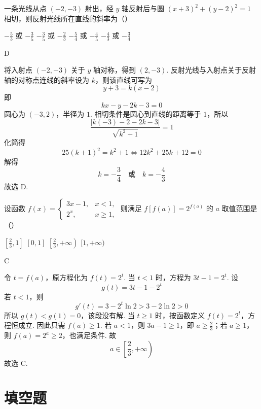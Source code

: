 \begin{problem}
一条光线从点 \((-2,-3)\) 射出，经 \(y\) 轴反射后与圆 \((x + 3)^2 + (y - 2)^2 = 1\) 相切，则反射光线所在直线的斜率为（\quad）

\choices
    {\(-\frac{5}{3}\) 或 \(-\frac{3}{5}\)}
    {\(-\frac{3}{5}\) 或 \(-\frac{2}{3}\)}
    {\(-\frac{5}{4}\) 或 \(-\frac{4}{5}\)}
    {\(-\frac{4}{3}\) 或 \(-\frac{3}{4}\)}
\end{problem}

\begin{answer}
D
\end{answer}

\begin{solution}
将入射点 \((-2,-3)\) 关于 \(y\) 轴对称，得到 \((2,-3)\). 反射光线与入射点关于反射轴的对称点连线的斜率设为 \(k\)，则该直线可写为
\[
y+3=k(x-2)
\]
即
\[
kx-y-2k-3=0
\]
圆心为 \((-3,2)\)，半径为 \(1\). 相切条件是圆心到直线的距离等于 \(1\)，所以
\[
\frac{|k(-3)-2-2k-3|}{\sqrt{k^2+1}}=1
\]
化简得
\[
25(k+1)^2=k^2+1
\iff 12k^2+25k+12=0
\]
解得
\[
k=-\frac34\quad\text{或}\quad k=-\frac43
\]
故选 D.
\end{solution}

\begin{problem}
设函数 \(f(x) = \begin{cases}
3x - 1, & x < 1,\\
2^x, & x \geqslant 1,
\end{cases}\) 则满足 \(f[f(a)] = 2^{f(a)}\) 的 \(a\) 取值范围是（\quad）

\choices
    {\(\left[\frac{2}{3},1\right]\)}
    {\([0,1]\)}
    {\(\left[\frac{2}{3},+\infty\right)\)}
    {\([1,+\infty)\)}
\end{problem}

\begin{answer}
C
\end{answer}

\begin{solution}
令 \(t=f(a)\)，原方程化为 \(f(t)=2^t\).
当 \(t<1\) 时，方程为 \(3t-1=2^t\). 设
\[
g(t)=3t-1-2^t
\]
若 \(t<1\)，则
\[
g'(t)=3-2^t\ln2>3-2\ln2>0
\]
所以 \(g(t)<g(1)=0\)，该段没有解.
当 \(t\geqslant1\) 时，按函数定义 \(f(t)=2^t\)，方程恒成立. 因此只需 \(f(a)\geqslant1\).
若 \(a<1\)，则 \(3a-1\geqslant1\)，即 \(a\geqslant\frac23\)；若 \(a\geqslant1\)，则 \(f(a)=2^a\geqslant2\)，也满足条件. 故
\[
a\in\left[\frac23,+\infty\right)
\]
故选 C.
\end{solution}

\section{填空题}

